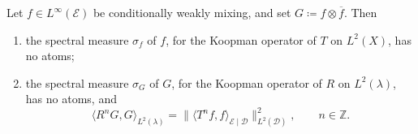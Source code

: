 \begin{lemma} \label{l:atomless}
Let $f \in L ^{\infty}(\mathcal E)$ be conditionally weakly mixing, and set $G \coloneqq f \otimes \overline f$.  Then 
\begin{enumerate}
\item[(i)] the spectral measure $\sigma _f$ of $f$, for the Koopman operator of $T$ on $L^2(X)$, has no atoms; 
\item[(ii)] the spectral measure $\sigma _G$ of $G$, for the Koopman operator of $R$ on $L^2(\lambda)$, has no atoms, and 
\begin{equation} \label{e:psiIdentity}
\langle R ^{n}G, G\rangle _{L^2(\lambda)} = \bigl\lVert \langle T ^{n}f, f\rangle _{\mathcal E\mid \mathcal D}\bigr\rVert _{L^2(\mathcal D)} ^2 , 
\qquad n \in \mathbb Z . 
\end{equation}
\end{enumerate}
\end{lemma}

